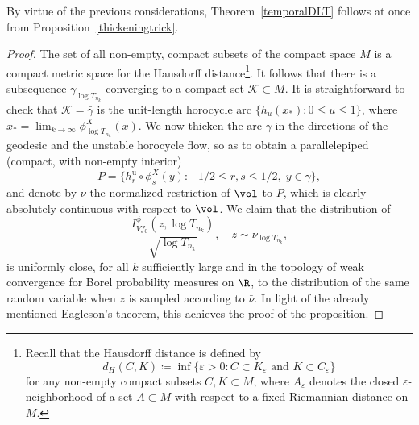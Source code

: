 \begin{appendix}
By virtue of the previous considerations, Theorem~\ref{temporalDLT} follows at once from Proposition~\ref{thickeningtrick}.

\begin{proof}
The set of all non-empty, compact subsets of the compact space $M$ is a compact metric space for the Hausdorff distance\footnote{Recall that the Hausdorff distance is defined by
\begin{equation*}
d_H(C,K)\coloneqq\inf\{\varepsilon >0:C\subset K_{\varepsilon} \text{ and }K\subset C_{\varepsilon} \}
\end{equation*}
for any non-empty compact subsets $C,K\subset M$, where $A_{\varepsilon }$ denotes the closed $\varepsilon $-neighborhood of a set $A\subset M$ with respect to a fixed Riemannian distance on $M$.}. It follows that there is a subsequence $\gamma_{\log{T_{n_k}}}$ converging to a compact set $\mathcal{K}\subset M$. It is straightforward to check that $\mathcal{K}=\bar{\gamma}$ is the unit-length horocycle arc $\{h_{u}(x_{*}):0\leq u\leq 1 \}$, where $x_*=\lim_{k\to\infty}\phi^{X}_{\log{T_{n_k}}}(x)$.
We now thicken the arc $\bar{\gamma}$ in the directions of the geodesic and the unstable horocycle flow, so as to obtain a parallelepiped (compact, with non-empty interior)
\begin{equation}
\label{parallelepiped}
P=\{h^{\mathrm{u}}_{r}\circ \phi^{X}_s (y):-1/2\leq r,s\leq 1/2,\;y\in \bar{\gamma} \},
\end{equation}
and denote by $\bar{\nu}$ the normalized restriction of $\vol$ to $P$, which is clearly absolutely continuous with respect to $\vol$. We claim that the distribution of
\[
\frac{I_{Vf_0}^{\phi}(z,\log{T_{n_k}})}{\sqrt{\log{T_{n_k}}}},\quad z\sim \nu_{\log{T_{n_k}}},
\]
is uniformly close, for all $k$ sufficiently large and in the topology of weak convergence for Borel probability measures on $\R$, to the distribution of the same random variable when $z$ is sampled according to $\bar{\nu}$. In light of the already mentioned Eagleson's theorem, this achieves the proof of the proposition.


\end{proof}
\end{appendix}
